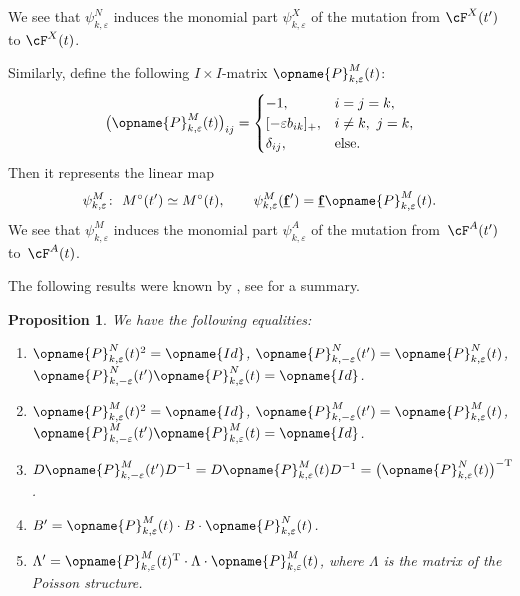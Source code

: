 \documentclass[pdftex]{sigma}
\newcommand{\Mc}{M^\circ}
\newcommand{\Id}{{\opname{Id}}}
\newcommand{\trans}{\opname{P}}
\newcommand{\ff}{\mathbf{f}}
\newcommand{\uff}{\underline{\ff}}
\numberwithin{equation}{section}
\newtheorem{Proposition}[Theorem]{Proposition}
 { \theoremstyle{definition}
\newtheorem{Definition}[Theorem]{Definition}
\newtheorem{Note}[Theorem]{Note}
\newtheorem{Example}[Theorem]{Example}
\newtheorem{Remark}[Theorem]{Remark}
\newtheorem{Assumption}[Theorem]{Assumption}
}
\begin{document}
We see that $\psi_{k,\varepsilon}^{N}$ induces the monomial part
$\psi_{k,\varepsilon}^{X}$ of the mutation from $\cF^{X}(t')$ to
$\cF^{X}(t)$.

Similarly, define the following $I\times I$-matrix $\trans_{k,\varepsilon}^{M}(t)$:
\begin{gather*}
\bigl(\trans_{k,\varepsilon}^{M}(t)\bigr)_{ij} = \begin{cases}
-1, & i=j=k,\\{}
[-\varepsilon b_{ik}]_{+}, & i\neq k,\ j=k,\\
\delta_{ij}, & \mathrm{else}.
\end{cases}
\end{gather*}
Then it represents the linear map
\[\psi_{k,\varepsilon}^{M}\colon\ \Mc(t')\simeq\Mc(t),\qquad \psi_{k,\varepsilon}^{M}(\uff') =\uff\trans_{k,\varepsilon}^{M}(t).\]
We see that $\psi_{k,\varepsilon}^{M}$ induces the monomial part
$\psi_{k,\varepsilon}^{A}$ of the mutation from~$\cF^{A}(t')$ to~$\cF^{A}(t)$.

The following results were known by \cite{BerensteinZelevinsky05,nakanishi2012tropical},
see \cite[Section~5.6]{Keller12} for a summary.

\begin{Proposition}\label{prop:matrix_properties} We have the following
equalities:
\begin{enumerate}\itemsep=0pt
 \item[$(1)$] $\trans_{k,\varepsilon}^{N}(t)^{2}=\Id$, $\trans_{k,-\varepsilon}^{N}(t')=\trans_{k,\varepsilon}^{N}(t)$,
 $\trans_{k,-\varepsilon}^{N}(t')\trans_{k,\varepsilon}^{N}(t)=\Id$.

 \item[$(2)$] $\trans_{k,\varepsilon}^{M}(t)^{2}=\Id$, $\trans_{k,-\varepsilon}^{M}(t')=\trans_{k,\varepsilon}^{M}(t)$,
 $\trans_{k,-\varepsilon}^{M}(t')\trans_{k,\varepsilon}^{M}(t)=\Id$.

 \item[$(3)$] $D\trans_{k,-\varepsilon}^{M}(t')D^{-1}=D\trans_{k,\varepsilon}^{M}(t)D^{-1}=\bigl(\trans_{k,\varepsilon}^{N}(t)\bigr)^{\rm -T}$.

 \item[$(4)$] $B'=\trans_{k,\varepsilon}^{M}(t)\cdot B\cdot\trans_{k,\varepsilon}^{N}(t)$.

 \item[$(5)$] $\Lambda'=\trans_{k,\varepsilon}^{M}(t)^{\rm T}\cdot\Lambda\cdot\trans_{k,\varepsilon}^{M}(t)$, where $\Lambda$ is the matrix of the Poisson structure.
\end{enumerate}
\end{Proposition}
\end{document}

